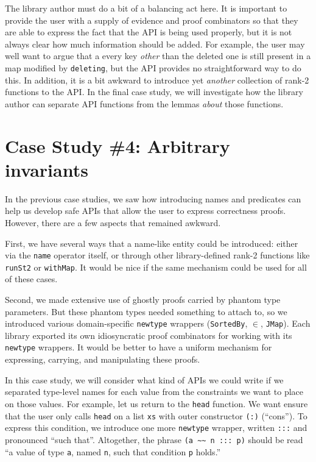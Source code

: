 \documentclass[format=sigplan, review=false, screen=true]{acmart}
\begin{document}
The library author must do a bit of a balancing act here. It is important to provide
the user with a supply of evidence and proof combinators so that they are able to
express the fact that the API is being used properly, but it is not always clear how
much information should be added. For example, the user may well want to argue that a
every key \emph{other} than the deleted one is still present in a map modified by
\texttt{deleting}, but the API provides no straightforward way to do this.
In addition, it is a bit awkward to introduce yet \emph{another} collection of
rank-2 functions to the API. In the final case study, we will investigate how
the library author can separate API functions from the lemmas \emph{about} those
functions.

\section{Case Study \#4: Arbitrary invariants}\label{full-gdp}

In the previous case studies, we saw how introducing names and predicates can
help us develop safe APIs that allow the user to express correctness proofs.
However, there are a few aspects that remained awkward.

First, we have several
ways that a name-like entity could be introduced: either via the \texttt{name} operator
itself, or through other library-defined rank-2 functions like \texttt{runSt2} or \texttt{withMap}.
It would be nice if the same mechanism could be used for all of these cases.

Second, we made extensive use of ghostly proofs carried by phantom type parameters. But these
phantom types needed something to attach to, so we introduced various domain-specific \texttt{newtype}
wrappers (\texttt{SortedBy}, \texttt{$\in$},  \texttt{JMap}). Each library exported its own
idiosyncratic proof combinators for working with its \texttt{newtype} wrappers. It would be better to have
a uniform mechanism for expressing, carrying, and manipulating these proofs.

In this case study, we will consider what kind of APIs we could write if we separated
type-level names for each value from the constraints we want to place on those values.
For example, let us return to the \texttt{head} function. We want ensure that the
user only calls \texttt{head} on a list \texttt{xs} with outer constructor \texttt{(:)} (``cons'').
To express this condition, we introduce one more \texttt{newtype} wrapper,
written \texttt{:::} and pronounced ``such that''. Altogether, the phrase 
\verb|(a ~~ n ::: p)| should be read ``a value of type \texttt{a}, named \texttt{n}, such
that condition \texttt{p} holds.''
\end{document}
